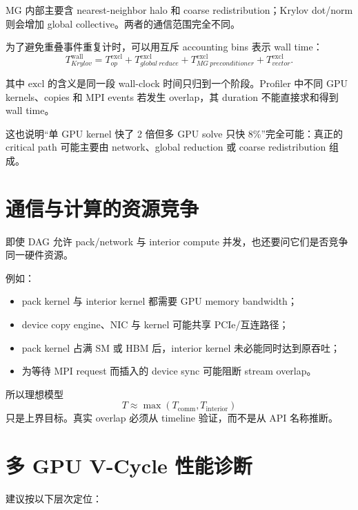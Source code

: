 MG 内部主要含 nearest-neighbor halo 和 coarse redistribution；Krylov dot/norm 则会增加 global collective。两者的通信范围完全不同。

为了避免重叠事件重复计时，可以用互斥 accounting bins 表示 wall time：
\begin{equation}
T_{Krylov}^{\mathrm{wall}}
=
T_{op}^{\mathrm{excl}}
+
T_{global\ reduce}^{\mathrm{excl}}
+
T_{MG\ preconditioner}^{\mathrm{excl}}
+
T_{vector}^{\mathrm{excl}}.
\label{eq:distributed-gpu-krylov-exclusive-cost}
\end{equation}

其中 $\mathrm{excl}$ 的含义是同一段 wall-clock 时间只归到一个阶段。Profiler 中不同 GPU kernels、copies 和 MPI events 若发生 overlap，其 duration 不能直接求和得到 wall time。

这也说明“单 GPU kernel 快了 2 倍但多 GPU solve 只快 8\%”完全可能：真正的 critical path 可能主要由 network、global reduction 或 coarse redistribution 组成。

\section{通信与计算的资源竞争}

即使 DAG 允许 pack/network 与 interior compute 并发，也还要问它们是否竞争同一硬件资源。

例如：
\begin{itemize}
\item pack kernel 与 interior kernel 都需要 GPU memory bandwidth；
\item device copy engine、NIC 与 kernel 可能共享 PCIe/互连路径；
\item pack kernel 占满 SM 或 HBM 后，interior kernel 未必能同时达到原吞吐；
\item 为等待 MPI request 而插入的 device sync 可能阻断 stream overlap。
\end{itemize}

所以理想模型
\begin{equation}
T
\approx
\max(T_{\mathrm{comm}},T_{\mathrm{interior}})
\end{equation}
只是上界目标。真实 overlap 必须从 timeline 验证，而不是从 API 名称推断。

\section{多 GPU V-Cycle 性能诊断}

建议按以下层次定位：

